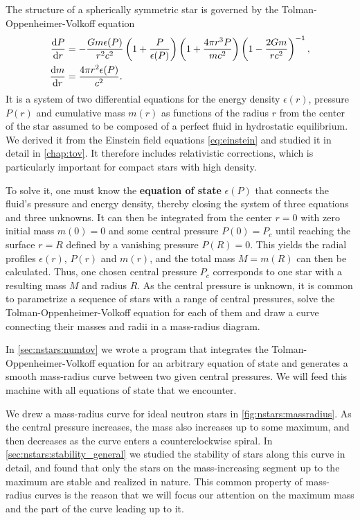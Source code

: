 The structure of a spherically symmetric star is governed by the Tolman-Oppenheimer-Volkoff equation
\begin{subequations}
\begin{align}
	\odv{P}{r} &= -\frac{G m \epsilon(P)}{r^2 c^2} \left( 1 + \frac{P}{\epsilon(P)} \right) \left( 1 + \frac{4 \pi r^3 P}{m c^2} \right) \left( 1 - \frac{2 G m}{r c^2} \right)^{-1} , \\
	\odv{m}{r} &= \frac{4 \pi r^2 \epsilon(P)}{c^2} .
\end{align}%
\label{eq:master_intro:tov}%
\end{subequations}%
It is a system of two differential equations for the energy density $\epsilon(r)$, pressure $P(r)$ and cumulative mass $m(r)$ as functions of the radius $r$ from the center of the star assumed to be composed of a perfect fluid in hydrostatic equilibrium.
We derived it from the Einstein field equations \eqref{eq:einstein} and studied it in detail in \cref{chap:tov}.
It therefore includes relativistic corrections, which is particularly important for compact stars with high density.

To solve it, one must know the \textbf{equation of state} $\epsilon(P)$ that connects the fluid's pressure and energy density,
thereby closing the system of three equations and three unknowns.
It can then be integrated from the center $r=0$ with zero initial mass $m(0) = 0$ and some central pressure $P(0) = P_c$ until reaching the surface $r=R$ defined by a vanishing pressure $P(R) = 0$.
This yields the radial profiles $\epsilon(r)$, $P(r)$ and $m(r)$, and the total mass $M = m(R)$ can then be calculated.
Thus, one chosen central pressure $P_c$ corresponds to one star with a resulting mass $M$ and radius $R$.
As the central pressure is unknown,
it is common to parametrize a sequence of stars with a range of central pressures,
solve the Tolman-Oppenheimer-Volkoff equation for each of them
and draw a curve connecting their masses and radii in a mass-radius diagram.

In \cref{sec:nstars:numtov} we wrote a program that integrates the Tolman-Oppenheimer-Volkoff equation for an arbitrary equation of state and generates a smooth mass-radius curve between two given central pressures.
We will feed this machine with all equations of state that we encounter.

We drew a mass-radius curve for ideal neutron stars in \cref{fig:nstars:massradius}.
As the central pressure increases,
the mass also increases up to some maximum,
and then decreases as the curve enters a counterclockwise spiral.
In \cref{sec:nstars:stability_general} we studied the stability of stars along this curve in detail,
and found that only the stars on the mass-increasing segment up to the maximum are stable and realized in nature.
This common property of mass-radius curves is the reason that we will focus our attention on the maximum mass and the part of the curve leading up to it.

